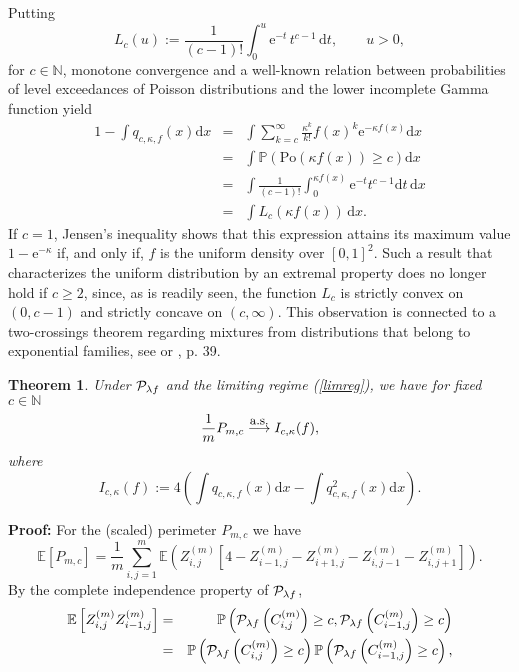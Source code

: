 \documentclass[12pt]{article}
\def\N{\mathbb{N}}
\def\PP{\mathbb{P}}
\def\BE{\mathbb{E}}
\def\cas{\stackrel{\mbox{\small{a.s.}}}{\longrightarrow}}
\newtheorem{theorem}{\bf{Theorem}}[section]
\begin{document}
Putting
\[
L_c(u) := \frac{1}{(c-1)!} \int_0^u \mbox{e}^{-t} \, t^{c-1} \, \mbox{d} t, \qquad u >0,
\]
for $c \in \mathbb{N}$, monotone convergence and a well-known relation between probabilities of level exceedances of Poisson distributions and the lower incomplete
Gamma function yield
\begin{eqnarray*}
1 - \int q_{c,\kappa,f}(x) \mbox{d} x & = & \int \sum_{k=c}^\infty \frac{\kappa^k}{k!} f(x)^k \mbox{e}^{-\kappa f(x)} \mbox{d} x\\
& = & \int \PP\left(\text{Po}(\kappa f(x)) \ge c\right) \mbox{d} x\\
& = & \int \frac{1}{(c-1)!} \int_0^{\kappa f(x)} \mbox{e}^{-t} t^{c-1} \mbox{d} t \, \mbox{d} x\\
& = & \int L_c\left(\kappa f(x)\right) \, \mbox{d} x.
\end{eqnarray*}
If $c=1$, Jensen's inequality shows that this expression attains its maximum value $1-\mbox{e}^{-\kappa}$ if, and only if, $f$ is the uniform density  over $[0,1]^2$.
Such a result that characterizes the uniform distribution by an extremal property does no longer hold if $c \ge 2$, since, as is readily seen,
the function $L_c$ is strictly convex on $(0,c-1)$ and strictly concave on $(c,\infty)$. This observation is connected to a two-crossings theorem regarding mixtures from
distributions that belong to exponential families, see \cite{40} or \cite{41}, p. 39.
%
%
%
%
\begin{theorem}
Under ${\cal P}_{\lambda f}$ and the limiting regime (\ref{limreg}), we have  for fixed $c\in\N$
\begin{equation*}
\frac1mP_{m,c}\cas I_{c,\kappa}(f),
\end{equation*}
where
\begin{equation*}
I_{c,\kappa}(f) := 4 \left(\int q_{c,\kappa,f}(x)\mbox{d} x -\int q_{c,\kappa,f}^2(x) \mbox{d} x \right).
\end{equation*}
\end{theorem}
{\bf Proof:} For the (scaled) perimeter $P_{m,c}$ we have
$$
\BE \left[P_{m,c}\right] = \frac{1}{m} \sum_{i,j=1}^m \BE\left( Z_{i,j}^{(m)} \left[4- Z_{i-1,j}^{(m)} - Z_{i+1,j}^{(m)} - Z_{i,j-1}^{(m)} - Z_{i,j+1}^{(m)}  \right]\right).
$$
By the complete independence property of ${\cal P}_{\lambda f}$,
\begin{eqnarray*}
\BE \left[Z_{i,j}^{(m)} Z_{i-1,j}^{(m)}\right] & = & \PP\left({\cal P}_{\lambda f}\left(C^{(m)}_{i,j}\right) \ge c, {\cal P}_{\lambda f}\left(C^{(m)}_{i-1,j}\right) \ge c \right)\\
& = & \PP\left({\cal P}_{\lambda f}\left(C^{(m)}_{i,j}\right) \ge c\right) \PP\left({\cal P}_{\lambda f}\left(C^{(m)}_{i-1,j}\right) \ge c \right),
\end{eqnarray*}
\end{document}
